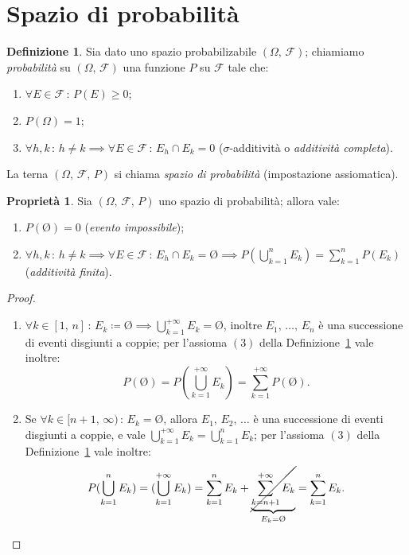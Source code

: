 \documentclass[12pt,openany]{amsbook}
\theoremstyle{plain}
\numberwithin{equation}{section} %
\theoremstyle{definition}
\newtheorem{defn}[thm]{Definizione}
\newtheorem{prty}[thm]{Proprietà}
\newcommand\nbdash{\nobreakdash-\hspace{0pt}}
\begin{document}
        \section{Spazio di probabilità}
            \begin{defn}\label{defn:Probabilità_impostazione_assiomatica}
                Sia dato uno spazio probabilizabile $(\Omega,\,\mathscr{F})$; chiamiamo \textit{probabilità} su $(\Omega,\,\mathscr{F})$ una funzione $P$ su $\mathscr{F}$ tale che:
                \begin{enumerate}
                    \item $\forall E \in \mathscr{F}\,:\,P(E) \geq 0$;
                    \item $P(\Omega) = 1$;
                    \item $\forall h,k\,:\,h \neq k \implies \forall E \in \mathscr{F}\,:\,E_h \cap E_k = 0$ ($\sigma$\nbdash additività o \textit{additività completa}).
                \end{enumerate}
                La terna $(\Omega,\,\mathscr{F},\,P)$ si chiama \textit{spazio di probabilità} (impostazione assiomatica).
            \end{defn}
            \begin{prty}\label{prty:Spazio_di_probabilità}
                Sia $(\Omega,\,\mathscr{F},\,P)$ uno spazio di probabilità; allora vale:
                \begin{enumerate}
                    \item $P(\text{\O}) = 0$ (\textit{evento impossibile});
                    \item $\forall h,k\,:\,h \neq k \implies \forall E \in \mathscr{F}\,:\,E_h \cap E_k = \text{\O} \implies P(\bigcup_{k=1}^{n} E_k) = \sum_{k=1}^{n} P(E_k)$ (\textit{additività finita}).
                \end{enumerate}
            \end{prty}
            \begin{proof}
                \hfill
                \begin{enumerate}
                    \item $\forall k \in [1,\,n]\,:\,E_k \coloneqq \text{\O} \implies \bigcup_{k=1}^{+\infty} E_k = \text{\O}$, inoltre $E_1,\,\ldots,\,E_n$ è una successione di eventi disgiunti a coppie; per l'assioma $(3)$ della Definizione~\ref{defn:Probabilità_impostazione_assiomatica} vale inoltre: \[
                            P\left(\text{\O}\right) = P\left(\bigcup_{k=1}^{+\infty} E_k\right) = \sum_{k=1}^{+\infty} P\left(\text{\O}\right)
                    .\] 
                \item Se $\forall k \in [n+1,\,\infty)\,:\,E_k = \text{\O}$, allora $E_1,\,E_2,\,\ldots$ è una successione di eventi disgiunti a coppie, e vale $\bigcup_{k=1}^{+\infty} E_k = \bigcup_{k=1}^{n} E_k$; per l'assioma $(3)$ della Definizione~\ref{defn:Probabilità_impostazione_assiomatica} vale inoltre: \[
                        P(\bigcup_{k=1}^{n} E_k) = (\bigcup_{k=1}^{+\infty} E_k) = \sum_{k=1}^{n} E_k + \underset{E_k = \text{\O}}{\underbrace{\cancel{\sum_{k=n+1}^{+\infty} E_k}}} = \sum_{k=1}^{n} E_k
                . \qedhere\]
                \end{enumerate}
            \end{proof}
\end{document}

